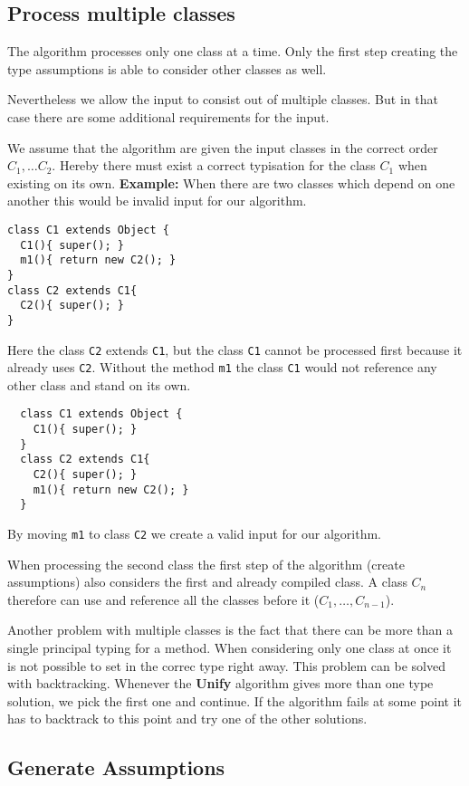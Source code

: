 \documentclass[runningheads]{llncs}
\begin{document}
\subsection{Process multiple classes}
The algorithm processes only one class at a time.
Only the first step creating the type assumptions is able to consider other classes as well.

Nevertheless we allow the input to consist out of multiple classes.
But in that case there are some additional requirements for the input.

We assume that the algorithm are given the input classes in the correct order $C_1, \ldots C_2$.
Hereby there must exist a correct typisation for the class $C_1$ when existing on its own.
\textbf{Example:}
When there are two classes which depend on one another this would be invalid input for our algorithm.
\begin{lstlisting}
class C1 extends Object {
  C1(){ super(); }
  m1(){ return new C2(); }
}
class C2 extends C1{
  C2(){ super(); }
}
\end{lstlisting}
Here the class \texttt{C2} extends \texttt{C1}, but the class \texttt{C1} cannot be processed first because it already uses \texttt{C2}.
Without the method \texttt{m1} the class \texttt{C1} would not reference any other class and stand on its own.
\begin{lstlisting}
  class C1 extends Object {
    C1(){ super(); }
  }
  class C2 extends C1{
    C2(){ super(); }
    m1(){ return new C2(); }
  }
  \end{lstlisting}
By moving \texttt{m1} to class \texttt{C2} we create a valid input for our algorithm.

When processing the second class the first step of the algorithm (create assumptions) also considers the first and already compiled class.
A class $C_n$ therefore can use and reference all the classes before it ($C_1, \ldots, C_{n-1}$).

Another problem with multiple classes is the fact that there can be more than a single principal typing for a method.
When considering only one class at once it is not possible to set in the correc type right away.
This problem can be solved with backtracking.
Whenever the \textbf{Unify} algorithm gives more than one type solution, we pick the first one and continue.
If the algorithm fails at some point it has to backtrack to this point and try one of the other solutions.

\subsection{Generate Assumptions}
\end{document}
